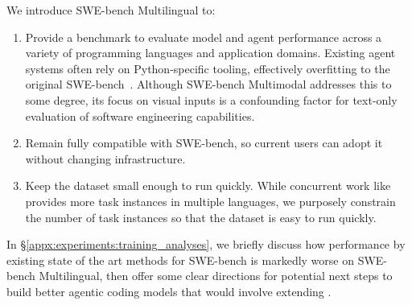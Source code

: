 We introduce SWE-bench Multilingual to:
\begin{enumerate}
\item Provide a benchmark to evaluate model and agent performance across a variety of programming languages and application domains. Existing agent systems often rely on Python-specific tooling, effectively overfitting to the original SWE-bench~\citep{yang_swe-bench_2024}. Although SWE-bench Multimodal addresses this to some degree, its focus on visual inputs is a confounding factor for text-only evaluation of software engineering capabilities.
\item Remain fully compatible with SWE-bench, so current users can adopt it without changing infrastructure.
\item Keep the dataset small enough to run quickly. While concurrent work like \citet{zan2025multiswebenchmultilingualbenchmarkissue} provides more task instances in multiple languages, we purposely constrain the number of task instances so that the dataset is easy to run quickly.
\end{enumerate}

In \S\ref{appx:experiments:training_analyses}, we briefly discuss how performance by existing state of the art methods for SWE-bench is markedly worse on SWE-bench Multilingual, then offer some clear directions for potential next steps to build better agentic coding models that would involve extending \bugs{}.